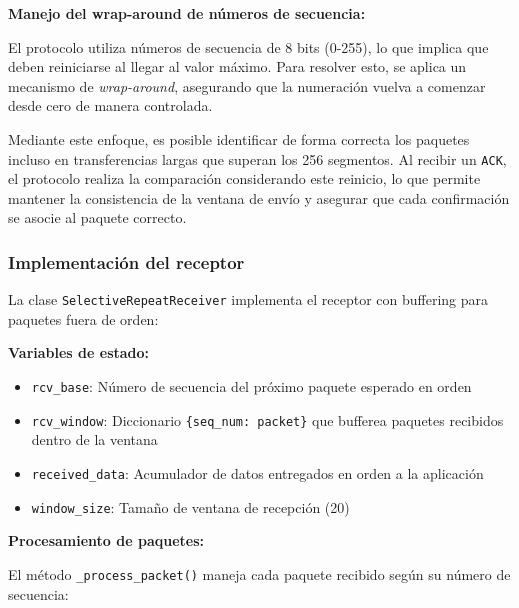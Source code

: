 \textbf{Manejo del wrap-around de números de secuencia:}

El protocolo utiliza números de secuencia de 8 bits (0-255), lo que implica que deben reiniciarse al llegar al valor máximo. Para resolver esto, se aplica un mecanismo de \textit{wrap-around}, asegurando que la numeración vuelva a comenzar desde cero de manera controlada. 

Mediante este enfoque, es posible identificar de forma correcta los paquetes incluso en transferencias largas que superan los 256 segmentos. Al recibir un \texttt{ACK}, el protocolo realiza la comparación considerando este reinicio, lo que permite mantener la consistencia de la ventana de envío y asegurar que cada confirmación se asocie al paquete correcto.

\subsubsection{Implementación del receptor}

La clase \texttt{SelectiveRepeatReceiver} implementa el receptor con buffering para paquetes fuera de orden:

\textbf{Variables de estado:}
\begin{itemize}
    \item \texttt{rcv\_base}: Número de secuencia del próximo paquete esperado en orden
    \item \texttt{rcv\_window}: Diccionario \texttt{\{seq\_num: packet\}} que bufferea paquetes recibidos dentro de la ventana
    \item \texttt{received\_data}: Acumulador de datos entregados en orden a la aplicación
    \item \texttt{window\_size}: Tamaño de ventana de recepción (20)
\end{itemize}

\textbf{Procesamiento de paquetes:}

El método \texttt{\_process\_packet()} maneja cada paquete recibido según su número de secuencia:

